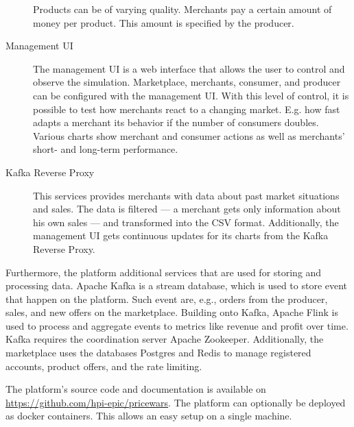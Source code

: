 \begin{description}
		Products can be of varying quality.
		Merchants pay a certain amount of money per product.
		This amount is specified by the producer.
	\item [Management UI]
		The management UI is a web interface that allows the user to control and observe the simulation.
		Marketplace, merchants, consumer, and producer can be configured with the management UI.
		With this level of control, it is possible to test how merchants react to a changing market. E.g. how fast adapts a merchant its behavior if the number of consumers doubles.
		Various charts show merchant and consumer actions as well as merchants' short- and long-term performance.
	\item [Kafka Reverse Proxy]
		This services provides merchants with data about past market situations and sales.
		The data is filtered --- a merchant gets only information about his own sales --- and transformed into the CSV format.
		Additionally, the management UI gets continuous updates for its charts from the Kafka Reverse Proxy.
		
\end{description}

Furthermore, the \pricewars platform additional services that are used for storing and processing data.
Apache Kafka is a stream database, which is used to store event that happen on the platform. Such event are, e.g., orders from the producer, sales, and new offers on the marketplace.
Building onto Kafka, Apache Flink is used to process and aggregate events to metrics like revenue and profit over time.
Kafka requires the coordination server Apache Zookeeper.
Additionally, the marketplace uses the databases Postgres and Redis to manage registered accounts, product offers, and the rate limiting.

The platform's source code and documentation is available on \url{https://github.com/hpi-epic/pricewars}.
The \pricewars platform can optionally be deployed as docker containers.
This allows an easy setup on a single machine.
